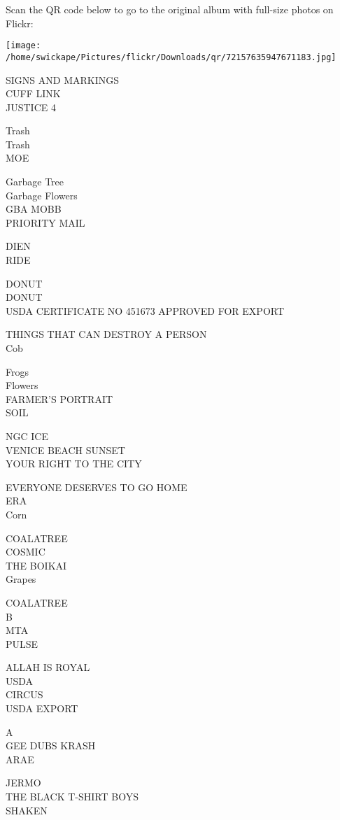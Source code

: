 \documentclass[10pt,letterpaper]{article}
\begin{document}
Scan the QR code below to go to the original album with full-size photos on Flickr:

\texttt{[image: /home/swickape/Pictures/flickr/Downloads/qr/72157635947671183.jpg]}


SIGNS AND MARKINGS\\
CUFF LINK\\
JUSTICE 4

Trash\\
Trash\\
MOE

Garbage Tree\\
Garbage Flowers\\
GBA MOBB\\
PRIORITY MAIL

DIEN\\
RIDE

DONUT\\
DONUT\\
USDA CERTIFICATE NO 451673 APPROVED FOR EXPORT

THINGS THAT CAN DESTROY A PERSON\\
Cob

Frogs\\
Flowers\\
FARMER'S PORTRAIT\\
SOIL

NGC ICE\\
VENICE BEACH SUNSET\\
YOUR RIGHT TO THE CITY

EVERYONE DESERVES TO GO HOME\\
ERA\\
Corn

COALATREE\\
COSMIC\\
THE BOIKAI\\
Grapes

COALATREE\\
B\\
MTA\\
PULSE

ALLAH IS ROYAL\\
USDA\\
CIRCUS\\
USDA EXPORT

A\\
GEE DUBS KRASH\\
ARAE

JERMO\\
THE BLACK T{-}SHIRT BOYS\\
SHAKEN
\end{document}

